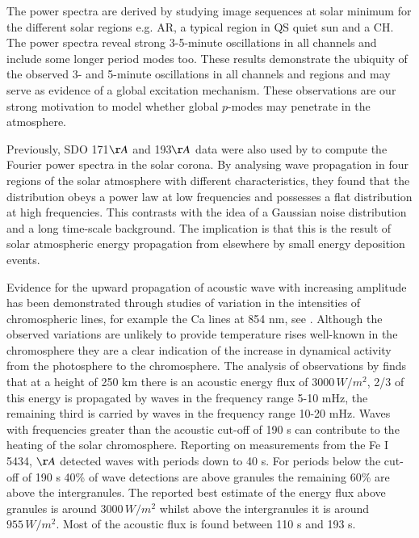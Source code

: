 \documentclass[preprint,authoryear,12pt]{elsarticle}
\begin{document}
 The power spectra are derived by studying image sequences at solar minimum for the different solar regions e.g. AR, a typical region in QS quiet sun and a CH. The power spectra reveal strong 3-5-minute oscillations in all channels and include some longer period modes too. These results demonstrate the ubiquity of the observed 3- and 5-minute oscillations in all channels and regions and may serve as evidence of a global excitation mechanism. These observations are our strong motivation to model whether global $p$-modes may penetrate in the atmosphere. 

Previously, SDO 171$\AA$ and 193$\AA$ data were also used by \citet{Ireland2015} to compute the Fourier power spectra in the solar corona. By analysing wave propagation in four regions of the solar atmosphere with different characteristics, they found that the distribution obeys a power law at low frequencies and possesses a flat distribution at high frequencies. This contrasts with the idea of a Gaussian noise distribution and a long time-scale background. The implication is that this is the result of solar atmospheric energy propagation from elsewhere by small energy deposition events.

Evidence for the upward propagation of acoustic wave with increasing amplitude has been demonstrated through studies of variation in the intensities of chromospheric lines, for example the Ca lines at 854 nm, see  \citet{Beck2012}. Although the 
observed variations are unlikely to provide temperature rises well-known in the chromosphere they are a clear indication of the increase in dynamical activity from the photosphere to the chromosphere. The analysis of observations by  \citet{Bello2009} finds that at a height of 250 km there is an acoustic energy flux of $3000 \,W/m^2$,  2/3 of this energy is propagated by waves in the frequency range 5-10 mHz, the remaining third is carried by waves in the frequency range 10-20 mHz. Waves with frequencies greater than the acoustic cut-off of 190 s can contribute to the heating of the solar chromosphere. Reporting on measurements from the Fe I 5434, ${\AA}$ \citet{Bello2010A} detected waves with periods down to 40 s. For periods below the cut-off of 190 s 40\% of wave detections are above granules the remaining 60\% are above the intergranules. The reported best estimate of the energy flux above granules is around $3000 \, W/m^2$ whilst above the intergranules it is around $955 \, W/m^2$. Most of the acoustic flux is found between 110 s and 193 s.
\end{document}
